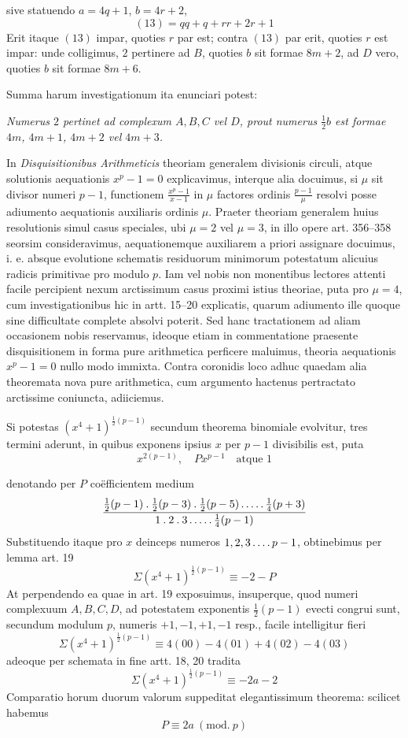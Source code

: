 %
sive statuendo $a=4q+1$, $b=4r+2$,
\[
(13)=qq+q+rr+2r+1
\]
Erit itaque $(13)$ impar, quoties $r$ par est; contra $(13)$ par erit, quoties $r$ est impar: unde colligimus, $2$ pertinere ad $B$, quoties $b$ sit formae $8m+2$, ad $D$ vero, quoties $b$ sit formae $8m+6$.

Summa harum investigationum ita enunciari potest:

\emph{Numerus $2$ pertinet ad complexum $A,B,C$ vel $D$, prout numerus $\frac12b$ est formae $4m$, $4m+1$, $4m+2$ vel $4m+3$.}

In \emph{Disquisitionibus Arithmeticis} theoriam generalem divisionis circuli, atque solutionis aequationis $x^p-1=0$ explicavimus, interque alia docuimus, si $\mu$ sit divisor numeri $p-1$, functionem $\frac{x^p-1}{x-1}$ in $\mu$ factores ordinis $\frac{p-1}{\mu}$ resolvi posse adiumento aequationis auxiliaris ordinis $\mu$. Praeter theoriam generalem huius resolutionis simul casus speciales, ubi $\mu=2$ vel $\mu=3$, in illo opere art. 356--358 seorsim consideravimus, aequationemque auxiliarem a priori assignare docuimus, i. e. absque evolutione schematis residuorum minimorum potestatum alicuius radicis primitivae pro modulo $p$. Iam vel nobis non monentibus lectores attenti facile percipient nexum arctissimum casus proximi istius theoriae, puta pro $\mu=4$, cum investigationibus hic in artt. 15--20 explicatis, quarum adiumento ille quoque sine difficultate complete absolvi poterit. Sed hanc tractationem ad aliam occasionem nobis reservamus, ideoque etiam in commentatione praesente disquisitionem in forma pure arithmetica perficere maluimus, theoria aequationis $x^p-1=0$ nullo modo immixta. Contra coronidis loco adhuc quaedam alia theoremata nova pure arithmetica, cum argumento hactenus pertractato arctissime coniuncta, adiiciemus.

Si potestas $(x^4+1)^{\frac12(p-1)}$ secundum theorema binomiale evolvitur, tres termini aderunt, in quibus exponens ipsius $x$ per $p-1$ divisibilis est, puta
\[
x^{2(p-1)},\quad Px^{p-1}\quad\text{atque }1
\]

%
denotando per $P$ coëfficientem medium
\[
\frac{\frac12(p-1)\mathbin{.}\frac12(p-3)\mathbin{.}\frac12(p-5)\mathinner{.\,.\,.\,.\,.}\frac14(p+3)}{1\mathbin{.}2\mathbin{.}3\mathinner{.\,.\,.\,.\,.}\frac14(p-1)}
\]
Substituendo itaque pro $x$ deinceps numeros $1,2,3\mathinner{.\,.\,.\,.} p-1$, obtinebimus per lemma art. 19
\[
\Sigma(x^4+1)^{\frac12(p-1)}\equiv-2-P
\]
At perpendendo ea quae in art. 19 exposuimus, insuperque, quod numeri complexuum $A,B,C,D$, ad potestatem exponentis $\frac12(p-1)$ evecti congrui sunt, secundum modulum $p$, numeris $+1,-1,+1,-1$ resp., facile intelligitur fieri
\[
\Sigma(x^4+1)^{\frac12(p-1)}\equiv4(00)-4(01)+4(02)-4(03)
\]
adeoque per schemata in fine artt. 18, 20 tradita
\[
\Sigma(x^4+1)^{\frac12(p-1)}\equiv-2a-2
\]
Comparatio horum duorum valorum suppeditat elegantissimum theorema: scilicet habemus
\[
P\equiv2a\ (\mathrm{mod.}\ p)
\]

